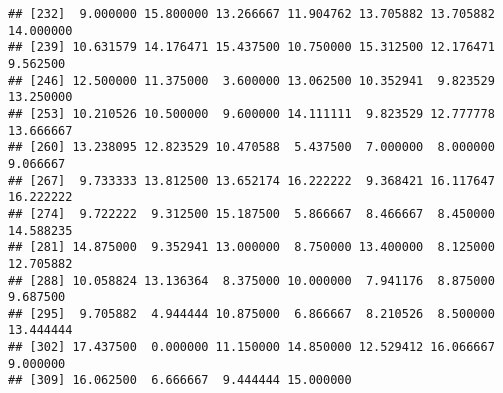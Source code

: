 \documentclass[
]{article}
\newenvironment{Shaded}{\begin{snugshade}}{\end{snugshade}}
\newcommand{\KeywordTok}[1]{\textcolor[rgb]{0.13,0.29,0.53}{\textbf{#1}}}
\newcommand{\NormalTok}[1]{#1}
\newcommand{\OperatorTok}[1]{\textcolor[rgb]{0.81,0.36,0.00}{\textbf{#1}}}
\newcommand{\StringTok}[1]{\textcolor[rgb]{0.31,0.60,0.02}{#1}}
\begin{document}
\begin{verbatim}
## [232]  9.000000 15.800000 13.266667 11.904762 13.705882 13.705882 14.000000
## [239] 10.631579 14.176471 15.437500 10.750000 15.312500 12.176471  9.562500
## [246] 12.500000 11.375000  3.600000 13.062500 10.352941  9.823529 13.250000
## [253] 10.210526 10.500000  9.600000 14.111111  9.823529 12.777778 13.666667
## [260] 13.238095 12.823529 10.470588  5.437500  7.000000  8.000000  9.066667
## [267]  9.733333 13.812500 13.652174 16.222222  9.368421 16.117647 16.222222
## [274]  9.722222  9.312500 15.187500  5.866667  8.466667  8.450000 14.588235
## [281] 14.875000  9.352941 13.000000  8.750000 13.400000  8.125000 12.705882
## [288] 10.058824 13.136364  8.375000 10.000000  7.941176  8.875000  9.687500
## [295]  9.705882  4.944444 10.875000  6.866667  8.210526  8.500000 13.444444
## [302] 17.437500  0.000000 11.150000 14.850000 12.529412 16.066667  9.000000
## [309] 16.062500  6.666667  9.444444 15.000000
\end{verbatim}

\begin{Shaded}
\end{Shaded}
\end{document}
